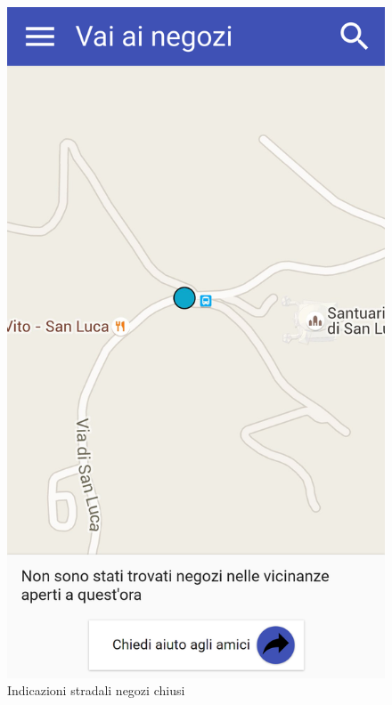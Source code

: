 \begin{figure}[H]
	\begin{minipage}{.49\textwidth}
		\includegraphics[width=\textwidth]{img/wireframe/mappa_negozi_chiusi.png}
		\caption{Indicazioni stradali negozi chiusi}
		\label{fig:indicazioni_stradali_negozi_chiusi}
	\end{minipage}
	\hfill
	\begin{minipage}{.49\textwidth}

\end{minipage}
\end{figure}
